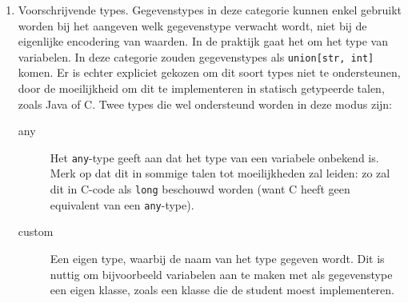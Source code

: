 \begin{enumerate}
    Het grote verschil is dat deze uitgebreide types standaard vertaald worden naar een van de basistypes.
    Voor talen die bijvoorbeeld geen \texttt{tuple} uit Python ondersteunen, zal het type omgezet worden naar \texttt{list}.
    Er is ook de mogelijk dat implementaties voor programmeertalen expliciet een bepaald type niet ondersteunen.
    Zo zal de Java-implementatie geen \texttt{uint64} (een unsigned 64-bit integer) ondersteunen, omdat er geen equivalent bestaat in de taal\footnote{Dit is slechts ter illustratie: in de implementatie van TESTed wordt \texttt{BigInteger} gebruikt.}.
    \item Voorschrijvende types.
    Gegevenstypes in deze categorie kunnen enkel gebruikt worden bij het aangeven welk gegevenstype verwacht wordt, niet bij de eigenlijke encodering van waarden.
    In de praktijk gaat het om het type van variabelen.
    In deze categorie zouden gegevenstypes als \texttt{union[str, int]} komen.
    Er is echter expliciet gekozen om dit soort types niet te ondersteunen, door de moeilijkheid om dit te implementeren in statisch getypeerde talen, zoals Java of C\@.
    Twee types die wel ondersteund worden in deze modus zijn:
    \begin{description}
        \item[any] Het \texttt{any}-type geeft aan dat het type van een variabele onbekend is.
        Merk op dat dit in sommige talen tot moeilijkheden zal leiden: zo zal dit in C-code als \texttt{long} beschouwd worden (want C heeft geen equivalent van een \texttt{any}-type).
        \item[custom] Een eigen type, waarbij de naam van het type gegeven wordt.
        Dit is nuttig om bijvoorbeeld variabelen aan te maken met als gegevenstype een eigen klasse, zoals een klasse die de student moest implementeren.
    \end{description}
\end{enumerate}

